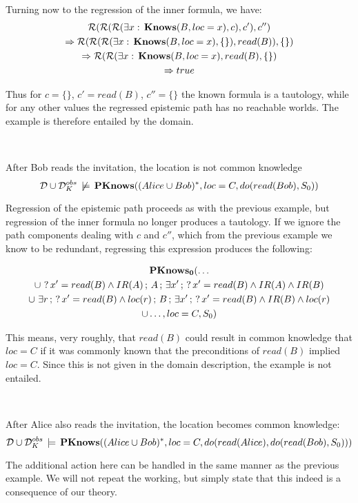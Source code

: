 Turning now to the regression of the inner formula, we have:\begin{gather*}
\mathcal{R}(\mathcal{R}(\mathcal{R}(\exists x:\,\mathbf{Knows}(B,loc=x),c),c'),c'')\\
\Rightarrow\mathcal{R}(\mathcal{R}(\mathcal{R}(\exists x:\,\mathbf{Knows}(B,loc=x),\{\}),read(B)),\{\})\\
\Rightarrow\mathcal{R}(\mathcal{R}(\exists x:\,\mathbf{Knows}(B,loc=x),read(B),\{\})\\
\Rightarrow true\end{gather*}


Thus for $c=\{\}$, $c'=read(B)$, $c''=\{\}$ the known formula is
a tautology, while for any other values the regressed epistemic path
has no reachable worlds. The example is therefore entailed by the
domain.

~

\begin{example}
After Bob reads the invitation, the location is not common knowledge\[
\mathcal{D}\cup\mathcal{D}_{K}^{obs}\,\not\models\,\mathbf{PKnows}((Alice\cup Bob)^{*},loc=C,do(read(Bob),S_{0}))\]

\end{example}
Regression of the epistemic path proceeds as with the previous example,
but regression of the inner formula no longer produces a tautology.
If we ignore the path components dealing with $c$ and $c''$, which
from the previous example we know to be redundant, regressing this
expression produces the following:

\begin{multline*}
\mathbf{PKnows_{0}}(\dots\\
\cup\,\,?\, x'=read(B)\wedge IR(A)\,;\, A\,;\,\exists x'\,;\,?\, x'=read(B)\wedge IR(A)\wedge IR(B)\\
\cup\,\,\exists r\,;\,?\, x'=read(B)\wedge loc(r)\,;\, B\,;\,\exists x'\,;\,?\, x'=read(B)\wedge IR(B)\wedge loc(r)\\
\cup\dots,loc=C,S_{0})\end{multline*}


This means, very roughly, that $read(B)$ could result in common knowledge
that $loc=C$ if it was commonly known that the preconditions of $read(B)$
implied $loc=C$. Since this is not given in the domain description,
the example is not entailed.

~

\begin{example}
After Alice also reads the invitation, the location becomes common
knowledge:\[
\mathcal{D}\cup\mathcal{D}_{K}^{obs}\,\models\,\mathbf{PKnows}((Alice\cup Bob)^{*},loc=C,do(read(Alice),do(read(Bob),S_{0})))\]

\end{example}
The additional action here can be handled in the same manner as the
previous example. We will not repeat the working, but simply state
that this indeed is a consequence of our theory.


